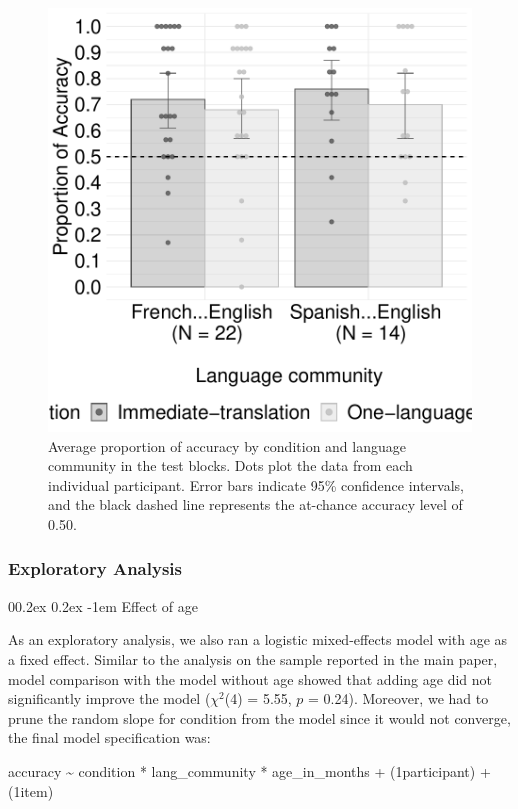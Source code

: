 \documentclass[
  man,floatsintext]{apa7}
\makeatletter
\let\oldparagraph\paragraph
\renewcommand{\paragraph}[1]{\oldparagraph{#1}\mbox{}}
\renewcommand{\paragraph}{\@startsection{paragraph}{4}{\parindent}%
  {0\baselineskip \@plus 0.2ex \@minus 0.2ex}%
  {-1em}%
  {\normalfont\normalsize\bfseries\itshape\typesectitle}}
\renewcommand{\paragraph}{\@startsection{paragraph}{4}{\parindent}%
  {0\baselineskip \@plus 0.2ex \@minus 0.2ex}%
  {-1em}%
  {\normalfont\normalsize\bfseries\typesectitle}}
\makeatother
\begin{document}
\begin{figure}

{\centering \includegraphics[width=0.6\linewidth]{TabletSwitch_supplemental_files/figure-latex/FigureS3-1} 

}

\caption{Average proportion of accuracy by condition and language community in the test blocks. Dots plot the data from each individual participant. Error bars indicate 95\% confidence intervals, and the black dashed line represents the at-chance accuracy level of 0.50.}\label{fig:FigureS3}
\end{figure}

\hypertarget{exploratory-analysis}{%
\subsubsection{Exploratory Analysis}\label{exploratory-analysis}}

\hypertarget{effect-of-age-1}{%
\paragraph{Effect of age}\label{effect-of-age-1}}

As an exploratory analysis, we also ran a logistic mixed-effects model with age as a fixed effect. Similar to the analysis on the sample reported in the main paper, model comparison with the model without age showed that adding age did not significantly improve the model (\(\chi^2\)(4) = 5.55, \(p\) = 0.24). Moreover, we had to prune the random slope for condition from the model since it would not converge, the final model specification was:

accuracy \textasciitilde{} condition * lang\_community * age\_in\_months + (1\textbar participant) + (1\textbar item)
\end{document}
